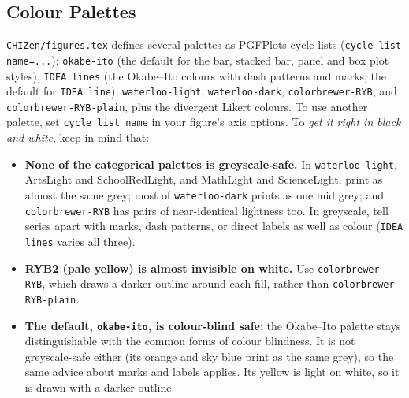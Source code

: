 

 
 



\subsection{Colour Palettes}
\label{sec:palettes}

\texttt{CHIZen/figures.tex} defines several palettes as PGFPlots cycle lists (\texttt{cycle list name=...}): \texttt{okabe-ito} (the default for the bar, stacked bar, panel and box plot styles), \texttt{IDEA lines} (the Okabe--Ito colours with dash patterns and marks; the default for \texttt{IDEA line}), \texttt{waterloo-light}, \texttt{waterloo-dark}, \texttt{colorbrewer-RYB}, and \texttt{colorbrewer-RYB-plain}, plus the divergent Likert colours. To use another palette, set \texttt{cycle list name} in your figure's axis options. To \emph{get it right in black and white}, keep in mind that:

\begin{itemize}
    \item \textbf{None of the categorical palettes is greyscale-safe.} In \texttt{waterloo-light}, ArtsLight and SchoolRedLight, and MathLight and ScienceLight, print as almost the same grey; most of \texttt{waterloo-dark} prints as one mid grey; and \texttt{colorbrewer-RYB} has pairs of near-identical lightness too. In greyscale, tell series apart with marks, dash patterns, or direct labels as well as colour (\texttt{IDEA lines} varies all three).
    \item \textbf{RYB2 (pale yellow) is almost invisible on white.} Use \texttt{colorbrewer-RYB}, which draws a darker outline around each fill, rather than \texttt{colorbrewer-RYB-plain}.
    \item \textbf{The default, \texttt{okabe-ito}, is colour-blind safe}: the Okabe--Ito palette stays distinguishable with the common forms of colour blindness. It is not greyscale-safe either (its orange and sky blue print as the same grey), so the same advice about marks and labels applies. Its yellow is light on white, so it is drawn with a darker outline.
\end{itemize}







